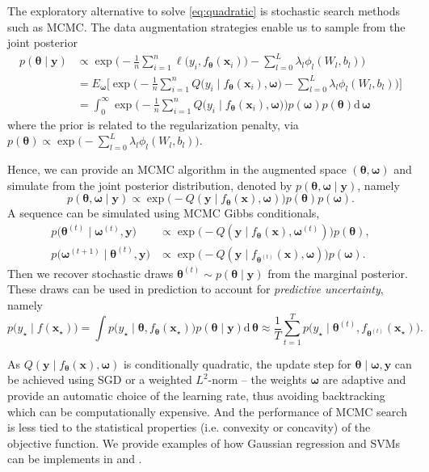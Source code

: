 \documentclass[ba]{imsart}
\newcommand{\bm}[1]{\boldsymbol{#1}}
\renewcommand{\d}{\mathrm{d}}
\def\bomega{\bm{\omega}}
\def\x{\bm{x}}
\def\y{\bm{y}}
\def\btheta{\bm{\theta}}
\renewcommand{\d}{\mathrm{d}\,}
\newcommand{\by}{{\bm y}}
\numberwithin{equation}{section}
\theoremstyle{plain}
\begin{document}
The exploratory alternative to solve \eqref{eq:quadratic} is stochastic search methods such as MCMC. The data augmentation strategies enable us to sample from the joint posterior 
\begin{align*}
p(\btheta\mid \y)&\propto \exp\Big(-\frac{1}{n}\sum_{i=1}^n \ell\big(y_i, f_{\btheta}(\x_i)\big)-\sum_{l=0}^L\lambda_l \phi_l(W_l, b_l) \Big) \\
&= E_{\bomega}\Big[\exp\Big(-\frac{1}{n}\sum_{i=1}^n  Q\big(y_i \mid f_{\btheta}(\x_i), \bomega\big)-\sum_{l=0}^L\lambda_l \phi_l(W_l, b_l) \Big)\Big]\\
& = \int_0^\infty  \exp \Big(-\frac{1}{n}\sum_{i=1}^n  Q(y_i \mid f_{\btheta}(\x_i), \bomega \big) \Big)p(\bomega) p(\btheta) \d\bomega
\end{align*}
where the prior is related to the regularization penalty, via  $p(\btheta)\propto \exp\big(-\sum_{l=0}^L\lambda_l \phi_l(W_l, b_l) \big)$. 

Hence, we can provide an MCMC algorithm in the augmented space $(\btheta, \bomega)$ and simulate from the joint posterior distribution, denoted by $p(\btheta,  \bomega\mid \y)$, namely
\[p(\btheta, \bomega\mid \by) \propto \exp\Big(-Q(\y \mid f_{\btheta}(\x),\bomega)\Big)p(\btheta)p(\bomega).
\]
A sequence can be simulated using  MCMC  Gibbs conditionals,
\begin{align*}
p\big(\btheta^{(t)} \mid \bomega^{(t)}, \y\big) & \propto \exp\Big(-Q(\y\mid f_{\btheta}(\x), \bomega^{(t)})\Big)p(\btheta), \\
p\big(\bomega^{(t+1)} \mid \btheta^{(t)},\y\big) &\propto \exp\Big(-Q( \y\mid f_{\btheta^{(t)}}(\x),\bomega)\Big)p(\bomega).
\end{align*}
Then we recover stochastic draws $\btheta^{(t)}\sim p(\btheta\mid \by )$ from the  marginal posterior. These draws can be used in  prediction to  account for  \textit{predictive uncertainty}, namely
\begin{equation}\label{eq:mcmc_pred}
p\big(y_\star\mid f(\x_\star)\big) =\int  p\big(y_\star\mid \btheta, f_{\btheta} (\x_\star)\big) p(\btheta\mid \y)\d \btheta \approx \frac{1}{T}\sum_{t=1}^T p\big(y_\star \mid \btheta^{(t)}, f_{\btheta^{(t)}} (\x_\star) \big).
\end{equation}

As $Q( \y \mid f_{\btheta}(\x),\bomega)$ is conditionally quadratic, the update step for $\btheta \mid \bomega, \y$ can be achieved using SGD or a weighted $L^2$-norm -- the weights $\bomega$ are adaptive and provide an automatic choice of the learning rate, thus avoiding backtracking which can be computationally expensive. And the performance of MCMC search is less tied to the statistical properties (i.e. convexity or concavity) of the objective function. We provide examples of how Gaussian regression and SVMs can be implements in  and .
   
\end{document}
